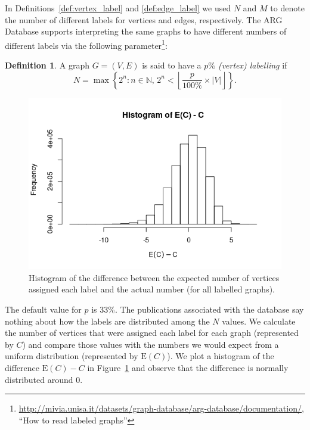 \documentclass{l4proj}
\theoremstyle{definition}
\newtheorem{definition}{Definition}[chapter]
\theoremstyle{remark}
\begin{document}
In Definitions~\ref{def:vertex_label} and \ref{def:edge_label} we used $N$ and
$M$ to denote the number of different labels for vertices and edges,
respectively. The ARG Database supports interpreting the same graphs to have
different numbers of different labels via the following
parameter\footnote{\url{http://mivia.unisa.it/datasets/graph-database/arg-database/documentation/},
``How to read labeled graphs''}:

\begin{definition} \label{def:percent_labelling}
  A graph $G = (V, E)$ is said to have a \emph{$p\%$ (vertex) labelling} if
  \[ N = \max \left\{ 2^n : n \in \mathbb{N},\, 2^n < \left\lfloor \frac{p}{100\%}
        \times |V| \right\rfloor \right\}. \]
\end{definition}

\begin{figure}
  \centering
  \includegraphics[scale=0.5]{images/labelling_histogram.png}
  \caption{Histogram of the difference between the expected number of vertices
    assigned each label and the actual number (for all labelled graphs).}
  \label{figure:labelling_histogram}
\end{figure}

The default value for $p$ is 33\%. The publications associated with the database
\cite{foggia2001-2, DBLP:journals/prl/SantoFSV03} say nothing about how the
labels are distributed among the $N$ values. We calculate the number of vertices
that were assigned each label for each graph (represented by $C$) and compare
those values with the numbers we would expect from a uniform distribution
(represented by $\mathrm{E}(C)$). We plot a histogram of the difference $\mathrm{E}(C) - C$ in
Figure~\ref{figure:labelling_histogram} and observe that the difference is
normally distributed around 0.
\end{document}
